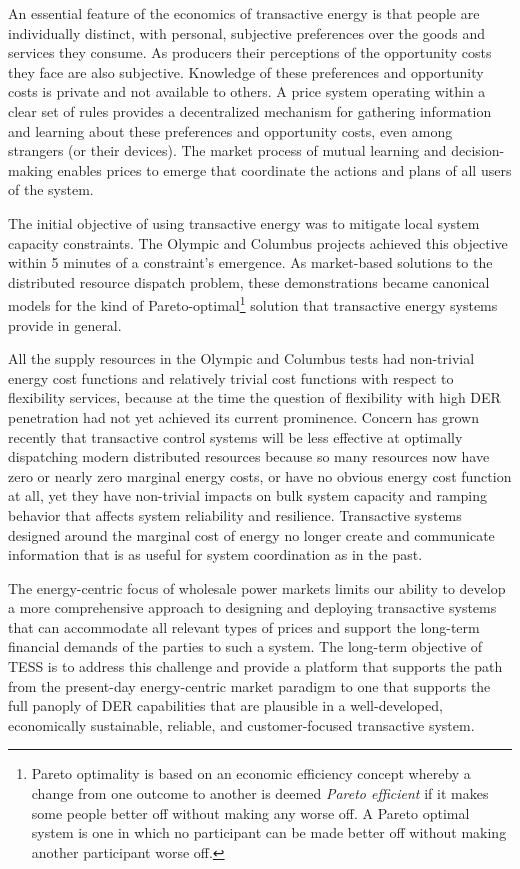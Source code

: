An essential feature of the economics of transactive energy is that people are individually distinct, with personal, subjective preferences over the goods and services they consume. As producers their perceptions of the opportunity costs they face are also subjective. Knowledge of these preferences and opportunity costs is private and not available to others. A price system operating within a clear set of rules provides a decentralized mechanism for gathering information and learning about these preferences and opportunity costs, even among strangers (or their devices). The market process of mutual learning and decision-making enables prices to emerge that coordinate the actions and plans of all users of the system.

The initial objective of using transactive energy was to mitigate local system capacity constraints. The Olympic \cite{hammerstrom2007} and Columbus \cite{widergren2014} projects achieved this objective within 5 minutes of a constraint's emergence. As market-based solutions to the distributed resource dispatch problem, these demonstrations became canonical models for the kind of Pareto-optimal\footnote{Pareto optimality is based on an economic efficiency concept whereby a change from one outcome to another is deemed \textit{Pareto efficient} if it makes some people better off without making any worse off. A Pareto optimal system is one in which no participant can be made better off without making another participant worse off.} solution that transactive energy systems provide in general.

All the supply resources in the Olympic and Columbus tests had non-trivial energy cost functions and relatively trivial cost functions with respect to flexibility services, because at the time the question of flexibility with high DER penetration had not yet achieved its current prominence.  Concern has grown recently that transactive control systems will be less effective at optimally dispatching modern distributed resources because so many resources now have zero or nearly zero marginal energy costs, or have no obvious energy cost function at all, yet they have non-trivial impacts on bulk system capacity and ramping behavior that affects system reliability and resilience. Transactive systems designed around the marginal cost of energy no longer create and communicate information that is as useful for system coordination as in the past. 

The energy-centric focus of wholesale power markets limits our ability to develop a more comprehensive approach to designing and deploying transactive systems that can accommodate all relevant types of prices and support the long-term financial demands of the parties to such a system. The long-term objective of TESS is to address this challenge and provide a platform that supports the path from the present-day energy-centric market paradigm to one that supports the full panoply of DER capabilities that are plausible in a well-developed, economically sustainable, reliable, and customer-focused transactive system.

